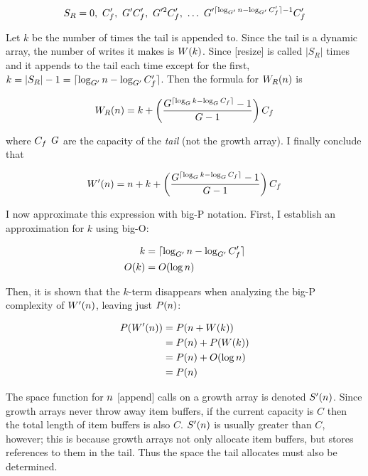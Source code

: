 $$
S_R = 0,\ \initcapacitynew,\ \growthfactornew\initcapacitynew,\ \growthfactornew^2\initcapacitynew,\ \ldots\ \growthfactornew^{\lceil \log_{\growthfactornew} \varnitems - \log_{\growthfactornew} \initcapacitynew \rceil - 1}\initcapacitynew
$$

Let $k$ be the number of times the tail is appended to. Since the tail is a dynamic array, the number of writes it makes is $W(k)$. Since [resize] is called $|S_R|$ times and it appends to the tail each time except for the first, $k = |S_R| - 1 = \lceil \log_{G'} n - \log_{G'} C_f' \rceil$. Then the formula for $W_R(n)$ is

$$
W_R(n) = k + \left( \frac{G^{\lceil \log_{G} k - \log_{G} C_f \rceil} - 1}{G - 1} \right) C_f
$$

where $C_f$ $G$ are the capacity of the \textit{tail} (not the growth array). I finally conclude that

$$
W'(n) = n + k + \left( \frac{G^{\lceil \log_{G} k - \log_{G} C_f \rceil} - 1}{G - 1} \right) C_f
$$

I now approximate this expression with big-P notation. First, I establish an approximation for $k$ using big-O:

\begin{align*}
k &= \lceil \log_{G'} n - \log_{G'} C_f' \rceil\\
O(k) &= O(\log n)
\end{align*}

Then, it is shown that the $k$-term disappears when analyzing the big-P complexity of $W'(n)$, leaving just $P(n)$:

\begin{align*}
P(W'(n)) &= P(n + W(k))\\
&= P(n) + P(W(k))\\
&= P(n) + O(\log n)\\
&= P(n)
\end{align*}

\scomplex

The space function for $n$ [append] calls on a growth array is denoted $S'(n)$. Since growth arrays never throw away item buffers, if the current capacity is $C$ then the total length of item buffers is also $C$. $S'(n)$ is usually greater than $C$, however; this is because growth arrays not only allocate item buffers, but stores references to them in the tail. Thus the space the tail allocates must also be determined.


